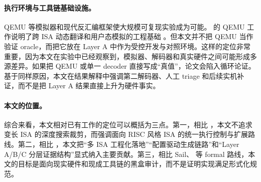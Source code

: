 \paragraph{执行环境与工具链基础设施。}
QEMU 等模拟器和现代反汇编框架使大规模可复现实验成为可能。\citeauthor{bellard2005qemu} 的 QEMU 工作说明了跨 ISA 动态翻译和用户态模拟的工程基础 \citep{bellard2005qemu}。但本文并不把 QEMU 当作验证 oracle，而把它放在 Layer A 中作为受控开发与对照环境。这样的定位非常重要，因为本文在实验中已经观察到，模拟器、解码器和真实硬件之间可能形成多源差异。如果把 QEMU 或单一 decoder 直接写成“真值”，论文会陷入循环论证。基于同样原因，本文在结果解释中强调第二解码器、人工 triage 和后续实机补证，而不是把 Layer A 结果直接上升为硬件事实。

\paragraph{本文的位置。}
综合来看，本文相对已有工作的定位可以概括为三点。第一，相比 ，本文不追求变长 ISA 的深度搜索裁剪，而强调面向 RISC 风格 ISA 的统一执行控制与扩展路线。第二，相比 ，本文把“多 ISA 工程化落地”“配置驱动生成链路”和“Layer A/B/C 分层证据结构”显式纳入主要贡献。第三，相比 Sail、 等 formal 路线，本文的目标是面向现实硬件和现成工具链的黑盒审计，而不是证明实现满足形式化规范。

